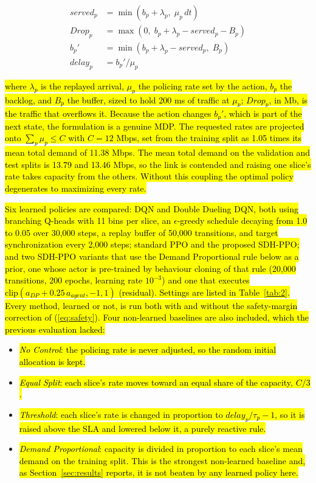 \documentclass[conference]{IEEEtran}
\newcommand{\rev}[1]{\hl{#1}}
\newcommand{\m}[1]{\mbox{$#1$}}
\begin{document}
\begin{equation}\label{eq:queue}
\begin{split}
served_p &= \min(b_p + \lambda_p,\; \mu_p\,dt) \\
Drop_p &= \max\!\left(0,\; b_p + \lambda_p - served_p - B_p\right) \\
b_p' &= \min\!\left(b_p + \lambda_p - served_p,\; B_p\right) \\
delay_p &= b_p' / \mu_p
\end{split}
\end{equation}

\rev{where \m{\lambda_p} is the replayed arrival, \m{\mu_p} the policing rate set by the action, \m{b_p} the backlog, and \m{B_p} the buffer, sized to hold 200 ms of traffic at \m{\mu_p}; \m{Drop_p}, in Mb, is the traffic that overflows it. Because the action changes \m{b_p'}, which is part of the next state, the formulation is a genuine MDP. The requested rates are projected onto \m{\sum_p \mu_p \le C} with \m{C = 12} Mbps, set from the training split as 1.05 times its mean total demand of 11.38 Mbps. The mean total demand on the validation and test splits is 13.79 and 13.46 Mbps, so the link is contended and raising one slice's rate takes capacity from the others. Without this coupling the optimal policy degenerates to maximizing every rate.}

\rev{Six learned policies are compared: DQN and Double Dueling DQN, both using branching Q-heads with 11 bins per slice, an \m{\epsilon}-greedy schedule decaying from 1.0 to 0.05 over 30,000 steps, a replay buffer of 50,000 transitions, and target synchronization every 2,000 steps; standard PPO and the proposed SDH-PPO; and two SDH-PPO variants that use the Demand Proportional rule below as a prior, one whose actor is pre-trained by behaviour cloning of that rule (20,000 transitions, 200 epochs, learning rate \m{10^{-3}}) and one that executes \m{\mathrm{clip}(a_{DP} + 0.25\,a_{agent}, -1, 1)} (residual). Settings are listed in Table~\ref{tab:2}. Every method, learned or not, is run both with and without the safety-margin correction of (\ref{eq:safety}). Four non-learned baselines are also included, which the previous evaluation lacked:}

\begin{itemize}
\item \rev{\emph{No Control}: the policing rate is never adjusted, so the random initial allocation is kept.}
\item \rev{\emph{Equal Split}: each slice's rate moves toward an equal share of the capacity, \m{C/3}.}
\item \rev{\emph{Threshold}: each slice's rate is changed in proportion to \m{delay_p/\tau_p - 1}, so it is raised above the SLA and lowered below it, a purely reactive rule.}
\item \rev{\emph{Demand Proportional}: capacity is divided in proportion to each slice's mean demand on the training split. This is the strongest non-learned baseline and, as Section~\ref{sec:results} reports, it is not beaten by any learned policy here.}
\end{itemize}
\end{document}

